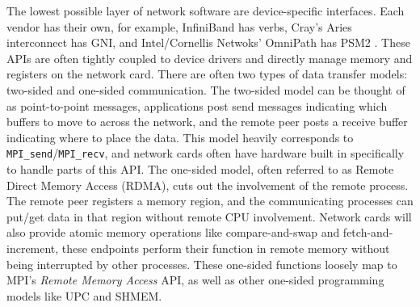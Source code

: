 The lowest possible layer of network software are device-specific interfaces. 
Each vendor has their own, for example, InfiniBand has verbs, Cray's Aries interconnect has GNI, and Intel/Cornellis Netwoks' OmniPath has PSM2 \cite{IBSpec,LibfabricGNICauseCrayisabut,IntelPSM2ProgGuide}.
These APIs are often tightly coupled to device drivers and directly manage memory and registers on the network card.
There are often two types of data transfer models: two-sided and one-sided communication.
The two-sided model can be thought of as point-to-point messages, applications post send messages indicating which buffers to move to across the network, and the remote peer posts a receive buffer indicating where to place the data.
This model heavily corresponds to \texttt{MPI\_send}/\texttt{MPI\_recv}, and network cards often have hardware built in specifically to handle parts of this API.  
The one-sided model, often referred to as Remote Direct Memory Access (RDMA), cuts out the involvement of the remote process.
The remote peer registers a memory region, and the communicating processes can put/get data in that region without remote CPU involvement.
Network cards will also provide atomic memory operations like compare-and-swap and fetch-and-increment, these endpoints perform their function in remote memory without being interrupted by other processes.
These one-sided functions loosely map to MPI's \textit{Remote Memory Access} API, as well as other one-sided programming models like UPC and SHMEM.

